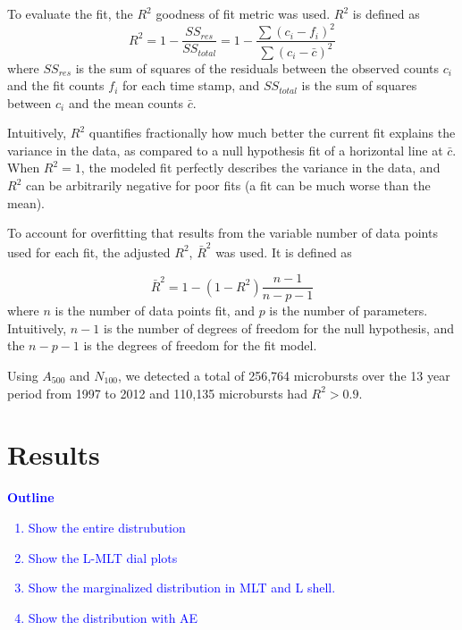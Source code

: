 \documentclass[draft]{agujournal2019}
\begin{document}
To evaluate the fit, the $R^2$ goodness of fit metric was used. $R^2$ is defined as
\begin{equation}
R^2 = 1 - \frac{SS_{res}}{SS_{total}} = 1 - \frac{\sum{(c_i-f_i)^2}}{\sum{(c_i-\bar{c})^2}}
\end{equation} where $SS_{res}$ is the sum of squares of the residuals between the observed counts $c_i$ and the fit counts $f_i$ for each time stamp, and $SS_{total}$ is the sum of squares between $c_i$ and the mean counts $\bar{c}$.

Intuitively, $R^2$ quantifies fractionally how much better the current fit explains the variance in the data, as compared to a null hypothesis fit of a horizontal line at $\bar{c}$. When $R^2=1$, the modeled fit perfectly describes the variance in the data, and $R^2$ can be arbitrarily negative for poor fits (a fit can be much worse than the mean).

To account for overfitting that results from the variable number of data points used for each fit, the adjusted $R^2$, $\bar{R}^2$ was used. It is defined as

\begin{equation}
\bar{R}^2 = 1 - (1-R^2) \frac{n-1}{n-p-1}
\end{equation} where $n$ is the number of data points fit, and $p$ is the number of parameters. Intuitively, $n-1$ is the number of degrees of freedom for the null hypothesis, and the $n-p-1$ is the degrees of freedom for the fit model.

Using $A_{500}$ and $N_{100}$, we detected a total of 256,764 microbursts over the 13 year period from 1997 to 2012 and 110,135 microbursts had $R^2 > 0.9$.

\section{Results}\label{results}
\textcolor{blue}{
\textbf{Outline}
\begin{enumerate}
    \item Show the entire distrubution
    \item Show the L-MLT dial plots
    \item Show the marginalized distribution in MLT and L shell.
    \item Show the distribution with AE
\end{enumerate}
}
\end{document}
